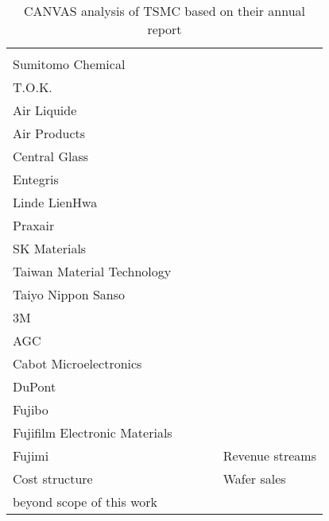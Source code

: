 \begin{table}[h]
\begin{adjustbox}{max width=\textwidth}
\begin{tabular}{lllll}
   &
   \\
Sumitomo Chemical &
   &
   &
   &
   \\
T.O.K. &
   &
   &
   &
   \\
Air Liquide &
   &
   &
   &
   \\
Air Products &
   &
   &
   &
   \\
Central Glass &
   &
   &
   &
   \\
Entegris &
   &
   &
   &
   \\
Linde LienHwa &
   &
   &
   &
   \\
Praxair &
   &
   &
   &
   \\
SK Materials &
   &
   &
   &
   \\
Taiwan Material Technology &
   &
   &
   &
   \\
Taiyo Nippon Sanso &
   &
   &
   &
   \\
3M &
   &
   &
   &
   \\
AGC &
   &
   &
   &
   \\
Cabot Microelectronics &
   &
   &
   &
   \\
DuPont &
   &
   &
   &
   \\
Fujibo &
   &
   &
   &
   \\
Fujifilm Electronic Materials &
   &
   &
   &
   \\
Fujimi &
   &
   &
   & \multicolumn{1}{l}{\cellcolor[HTML]{FFCCC9}Revenue streams}
   \\ 
\multicolumn{1}{l}{\cellcolor[HTML]{FFCCC9}Cost structure} &
   & 
   &
   &  Wafer sales 
   \\  beyond scope of this work
 &
   & 
   &
   & 
  
\end{tabular}
\end{adjustbox}
\caption{CANVAS analysis of TSMC based on their annual report \cite{TSMCAnnualReport}}
\label{tab:tsmc-canvas}
\end{table}